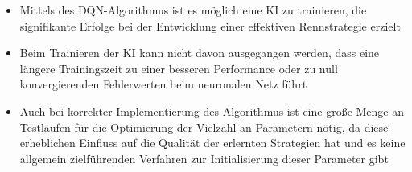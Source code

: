 \begin{itemize}
    \item Mittels des DQN-Algorithmus ist es möglich eine KI zu trainieren, die signifikante Erfolge bei der Entwicklung einer effektiven Rennstrategie erzielt
    \item Beim Trainieren der KI kann nicht davon ausgegangen werden, dass eine längere Trainingszeit zu einer besseren Performance oder zu null konvergierenden Fehlerwerten beim neuronalen Netz führt
    \item Auch bei korrekter Implementierung des Algorithmus ist eine große Menge an Testläufen für die Optimierung der Vielzahl an Parametern nötig, da diese erheblichen Einfluss auf die Qualität der erlernten Strategien hat und es keine allgemein zielführenden Verfahren zur Initialisierung dieser Parameter gibt
\end{itemize}


